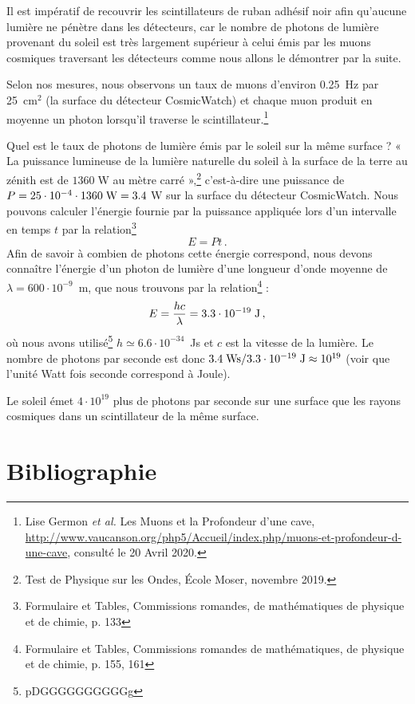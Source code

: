 \documentclass[a4paper, 12pt]{article}
\begin{document}
\begin{spacing}{1.5}
Il est impératif de recouvrir les scintillateurs de ruban adhésif noir afin qu'aucune lumière ne pénètre dans les détecteurs, car le nombre de photons de lumière provenant du soleil est très largement supérieur à celui émis par les muons cosmiques traversant les détecteurs comme nous allons le démontrer par la suite. 

Selon nos mesures, nous observons un taux de muons d'environ 0.25~Hz par 25~cm$^2$ (la surface du détecteur CosmicWatch) et chaque muon produit en moyenne un photon lorsqu'il traverse le scintillateur.\footnote{Lise Germon \emph{et al.} Les Muons et la Profondeur d'une cave, \url{http://www.vaucanson.org/php5/Accueil/index.php/muons-et-profondeur-d-une-cave}, consulté le 20 Avril 2020.} 

Quel est le taux de photons de lumière émis par le soleil sur la même surface ? « La puissance lumineuse de la lumière naturelle du soleil à la surface de la terre au zénith est de $1360\;$W au mètre carré »,\footnote{Test de Physique sur les Ondes, École Moser, novembre 2019.} c'est-à-dire une puissance de $P=25\cdot10^{-4}\cdot1360\;{\rm W}=3.4\;$W sur la surface du détecteur CosmicWatch. Nous pouvons calculer l'énergie fournie par la puissance appliquée lors d'un intervalle en temps $t$ par la relation\footnote{Formulaire et Tables, Commissions romandes, de mathématiques de physique et de chimie, p. 133} 
\begin{equation}
E = Pt \label{eq:energiepuissance}\,.
\end{equation}
Afin de savoir à combien de photons cette énergie correspond, nous devons connaître l'énergie d'un photon de lumière d'une longueur d'onde moyenne de $\lambda = 600\cdot10^{-9}$~m, que nous trouvons par la relation\footnote{Formulaire et Tables, Commissions romandes de mathématiques, de physique et de chimie, p. 155, 161} : 
\begin{equation}
E =\frac{hc}{\lambda} = 3.3\cdot10^{-19}\;{\rm J}\,,
\end{equation}
où nous avons utilisé\footnote{pDGGGGGGGGGGg} $h\simeq6.6\cdot10^{-34}$~Js et $c$ est la vitesse de la lumière. Le nombre de photons par seconde est donc  $3.4\;{\rm Ws}/3.3\cdot10^{-19}\;{\rm J}\approx10^{19}$ (voir que l'unité Watt fois seconde correspond à Joule).

Le soleil émet $4\cdot10^{19}$ plus de photons par seconde sur une surface que les rayons cosmiques dans un scintillateur de la même surface. 


\pagebreak

\section{Bibliographie}

\end{spacing}
\end{document}
